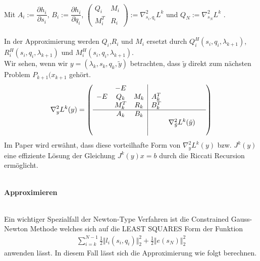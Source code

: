 \documentclass[12pt,a4paper]{article}
\begin{document}
  \\
  Mit $ A_i := \dfrac{\partial h_i}{\partial s_i} $, 
  $ B_i := \dfrac{\partial h_i}{\partial q_i} $,
  $
  \begin{pmatrix}
  Q_i & M_i \\
  M_i^{T} & R_i
  \end{pmatrix} := \nabla_{s_i,q_i}^{2}L^{k} $ und 
  $ Q_N := \nabla_{s_N}^{2}L^{k} $ .\\
  \\
  In der Approximierung werden $ Q_i $,$ R_i $ und $ M_i $ ersetzt durch $ Q_i^{H}(s_i,q_i,\lambda_{k+1}) $,$ R_i^{H}(s_i,q_i,\lambda_{k+1}) $ und $ M_i^{H}(s_i,q_i,\lambda_{k+1}) $.\\
  Wir sehen, wenn wir $ y = (\lambda_k, s_k,q_k, \tilde{y}) $ betrachten, dass $\tilde{y}$ direkt zum nächsten Problem $ P_{k+1}(x_{k+1} $ gehört.
  \begin{align*} 
  \nabla_{y}^{2} L^{k}(y) =
  \left(   
  \begin{array}{ccc|ccc}
    & -E      &     &         &     &           \\
-E  & Q_k     & M_k & A_k^{T} &     &           \\
    & M_k^{T} & R_k & B_k^{T} &     &           \\ \hline
    & A_k     & B_k &         &     &           \\
    &         &     &     & \nabla_{\tilde{y}}^{2} L^{k}(\tilde{y}) &   \\
    &         &     &         &    &     
  \end{array} \right) 
  \end{align*}
  Im Paper wird erwähnt, dass diese vorteilhafte Form von $\nabla_{y}^{2} L^{k}(y) $ bzw. $ J^{k}(y) $ eine effiziente Lösung der Gleichung $ J^{k}(y)x = b $ durch die Riccati Recursion ermöglicht.\\
  \\
  \newpage
  \begin{large}
  \textbf{Approximieren}
  \end{large} \\
  Ein wichtiger Spezialfall der Newton-Type Verfahren ist die Constrained Gauss-Newton Methode welches sich auf die LEAST SQUARES Form der Funktion
  \begin{align*}
  \sum_{i = k}^{N-1}\frac{1}{2}\Vert l_i (s_i , q_i )\Vert_{2}^{2} +\frac{1}{2}\Vert e (s_N )\Vert_{2}^{2}
  \end{align*}
  anwenden lässt. In diesem Fall lässt sich die Approximierung wie folgt berechnen.
\end{document}
